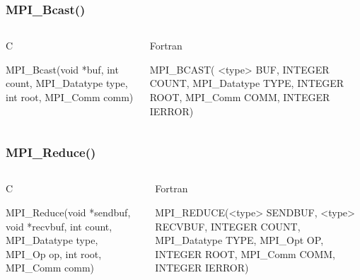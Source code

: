 \documentclass{beamer}
\begin{document}
\begin{frame}[fragile]
\frametitle{MPI\_Bcast()}
   \begin{columns}[T]
    \begin{column}{5cm}
     \begin{block}{C}
      \begin{semiverbatim}
MPI\_Bcast(void   *buf,
           int  count,
  MPI\_Datatype   type,
           int   root,
      MPI\_Comm   comm)
      \end{semiverbatim}
     \end{block}
    \end{column}
    \begin{column}{5cm}
     \begin{block}{Fortran}
      \begin{semiverbatim}
MPI\_BCAST( <type>    BUF,
         INTEGER   COUNT,
    MPI\_Datatype    TYPE,
         INTEGER    ROOT,
        MPI\_Comm    COMM,
         INTEGER  IERROR)
      \end{semiverbatim}
     \end{block}
    \end{column}
   \end{columns}
\end{frame}
\begin{frame}[fragile]
\frametitle{MPI\_Reduce()}
   \begin{columns}[T]
    \begin{column}{5cm}
     \begin{block}{C}
      \begin{semiverbatim}
MPI\_Reduce(void *sendbuf,
           void *recvbuf,
            int    count,
   MPI\_Datatype     type,
         MPI\_Op       op,
            int     root,
       MPI\_Comm     comm)
      \end{semiverbatim}
     \end{block}
    \end{column}
    \begin{column}{5cm}
     \begin{block}{Fortran}
      \begin{semiverbatim}
MPI\_REDUCE(<type> SENDBUF,
           <type> RECVBUF,
          INTEGER  COUNT,
     MPI\_Datatype   TYPE,
          MPI\_Opt     OP,
          INTEGER   ROOT,
         MPI\_Comm   COMM,
          INTEGER IERROR)
      \end{semiverbatim}
     \end{block}
    \end{column}
   \end{columns}
%
\end{frame}
\end{document}
